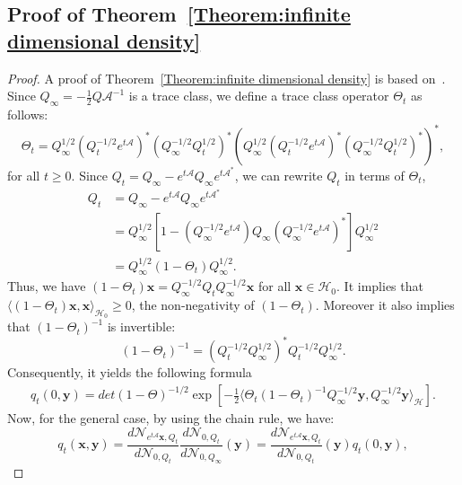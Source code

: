 \documentclass[nohyperref]{article}
\theoremstyle{plain}
\theoremstyle{remark}
\newcommand{\la}{\langle}
\newcommand{\ra}{\rangle}
\newcommand{\mc}{\mathcal}
\newcommand{\mb}{\mathbf}
\begin{document}
\subsection{Proof of Theorem~\ref{Theorem:infinite dimensional density}}
\begin{proof}
A proof of Theorem~\ref{Theorem:infinite dimensional density} is based on~\citep[Chap. 10.3]{da2002second}. Since $Q_{\infty} = -\frac{1}{2}Q \mc{A}^{-1}$ is a trace class, we define a trace class operator $\Theta_t$ as follows:
\begin{equation}
    \Theta_t = Q_{\infty}^{1/2} (Q^{-1/2}_t e^{t\mc{A}})^{*}(Q_{\infty}^{-1/2} Q^{1/2}_t)^{*} (Q_{\infty}^{1/2} (Q^{-1/2}_t e^{t\mc{A}})^{*}(Q_{\infty}^{-1/2} Q^{1/2}_t)^{*})^{*},
\end{equation}
for all $t \geq 0$. Since $Q_t = Q_{\infty } - e^{t\mc{A}}Q_{\infty}e^{t\mc{A}^{*}}$, we can rewrite $Q_t$ in terms of $\Theta_t$,
\begin{align}
    Q_t &= Q_{\infty} - e^{t\mc{A}}Q_{\infty}e^{t\mc{A}^{*}}\\
    & = Q^{1/2}_{\infty}\left[1 - (Q^{-1/2}_{\infty} e^{t\mc{A}}) Q_{\infty}(Q^{-1/2}_{\infty} e^{t\mc{A}})^{*}\right]Q^{1/2}_{\infty} \\
    & = Q^{1/2}_{\infty}(1-\Theta_t)Q^{1/2}_{\infty}.
\end{align}
Thus, we have $(1-\Theta_t)\mb{x} = Q^{-1/2}_{\infty}Q_t Q^{-1/2}_{\infty} \mb{x}$ for all $\mb{x} \in \mc{H}_0$. It implies that $\la (1-\Theta_t)\mb{x}, \mb{x}\ra_{\mc{H}_0} \geq 0$, the non-negativity of $(1-\Theta_t)$. Moreover it also implies that $(1-\Theta_t)^{-1}$ is invertible:
\begin{equation}\label{eq:one minus theta_t}
    (1-\Theta_t)^{-1} = (Q^{-1/2}_t Q^{1/2}_{\infty})^{*} Q^{-1/2}_t Q^{1/2}_{\infty}.
\end{equation}
Consequently, it yields the following formula~\citep[Proposition. 1.3.11]{da2002second}
\begin{align}\label{eq:proposition1.3.11}
    q_t(0, \mb{y}) = \textit{det}(1-\Theta)^{-1/2} \exp\left[-\frac{1}{2}\la \Theta_t (1-\Theta_t)^{-1} Q^{-1/2}_{\infty}\mb{y}, Q^{-1/2}_{\infty}\mb{y}\ra_{\mc{H}}\right].
\end{align}
Now, for the general case, by using the chain rule, we have:
\begin{equation}\label{eq:explicit density}
    q_t(\mb{x}, \mb{y}) = \frac{d\mc{N}_{e^{t\mc{A}}\mb{x}, Q_t}}{d\mc{N}_{0, Q_t}} \frac{d\mc{N}_{0, Q_t}} {d\mc{N}_{0, Q_{\infty}}}(\mb{y}) = \frac{d\mc{N}_{e^{t\mc{A}}\mb{x}, Q_t}}{d\mc{N}_{0, Q_t}}(\mb{y}) q_t(0, \mb{y}),

\end{equation}
\end{proof}
\end{document}
